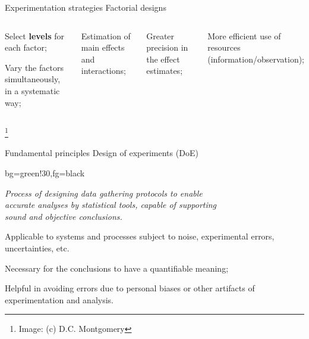\documentclass[t]{beamer}
\begin{document}
\begin{ftst}
{Experimentation strategies}
{Factorial designs}
\begin{columns}[T]
	\begin{block}{}
		\bitems Select \textbf{levels} for each factor;
			\item Vary the factors simultaneously, in a systematic way;
		\eitem
	\end{block}
	\bitems Estimation of main effects and interactions;
		\item Greater precision in the effect estimates;
		\item More efficient use of resources (information/observation);
	\eitem
\end{columns}
\let\thefootnote\relax\footnote{\tiny Image: (c) D.C. Montgomery}
\end{ftst}


\begin{ftst}
{Fundamental principles}
{Design of experiments (DoE)}
\vone
\begin{colorblock}{}{bg=green!30,fg=black}
\begin{center}
\textit{Process of designing data gathering protocols to enable\\
accurate analyses by statistical tools, capable of supporting\\
sound and objective conclusions.}
\end{center}
\end{colorblock}

\bitems Applicable to systems and processes subject to noise, experimental errors, uncertainties, etc.
	\item Necessary for the conclusions to have a quantifiable meaning;
	\item Helpful in avoiding errors due to personal biases or other artifacts of experimentation and analysis.
\eitem
\end{ftst}
\end{document}
